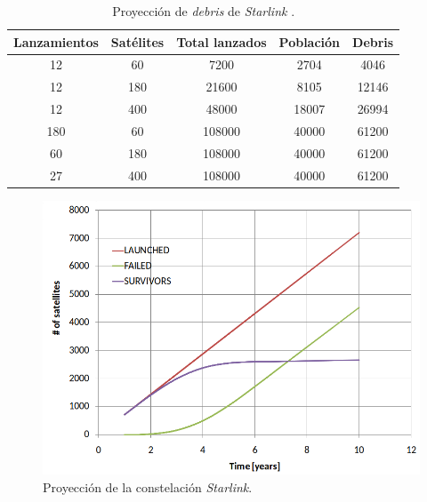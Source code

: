 \begin{table}[h]
	\centering
    \caption[Proyección de \emph{debris}]{Proyección de \emph{debris} de \emph{Starlink} \citep{ARTICLE:cibils}.}
	\begin{tabular}{c c c c c}    
		\toprule
        \textbf{Lanzamientos} & \textbf{Satélites} & \textbf{Total lanzados} & \textbf{Población} & \textbf{Debris}\\
		\midrule
        12                    & 60                 & 7200                    & 2704               & 4046\\		
        12                    & 180                & 21600                   & 8105               & 12146\\		
        12                    & 400                & 48000                   & 18007              & 26994\\		
        180                   & 60                 & 108000                  & 40000              & 61200\\		
        60                    & 180                & 108000                  & 40000              & 61200\\		
        27                    & 400                & 108000                  & 40000              & 61200\\		
		\bottomrule
		\hline
	\end{tabular}
	\label{tab:starlinkdebris}
\end{table}

\newpage

\begin{figure}[htbp]
	\centering
    \includegraphics[width=\textwidth]{./Figures/starlinkpopulation.png}
    \caption{Proyección de la constelación \emph{Starlink}\protect\footnotemark.}
    \label{fig:starlinkdeath}
\end{figure}

